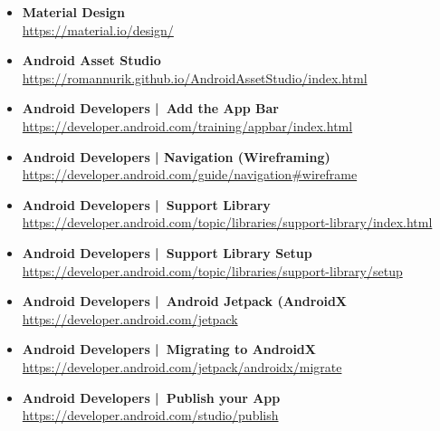 \documentclass[a4paper]{article}
\begin{document}
{\begin{itemize}
		\item \textbf{Material Design}\\
		\href{https://material.io/design/}
		{https://material.io/design/}
		
		\item \textbf{Android Asset Studio}\\
		\href{https://romannurik.github.io/AndroidAssetStudio/index.html}
		{https://romannurik.github.io/AndroidAssetStudio/index.html}
		
		\item \textbf{Android Developers | Add the App Bar}\\
		\href{https://developer.android.com/training/appbar/index.html}
		{https://developer.android.com/training/appbar/index.html}
		
		\item \textbf{Android Developers | Navigation (Wireframing)}\\
		\href{https://developer.android.com/guide/navigation#wireframe}
		{https://developer.android.com/guide/navigation\#wireframe}
		
		\item \textbf{Android Developers | Support Library}\\
		\href{https://developer.android.com/topic/libraries/support-library/index.html}
		{https://developer.android.com/topic/libraries/support-library/index.html}
		
		\item \textbf{Android Developers | Support Library Setup}\\
		\href{https://developer.android.com/topic/libraries/support-library/setup}
		{https://developer.android.com/topic/libraries/support-library/setup}
		
		\item \textbf{Android Developers | Android Jetpack (AndroidX}\\
		\href{https://developer.android.com/jetpack}
		{https://developer.android.com/jetpack}
		
		\item \textbf{Android Developers | Migrating to AndroidX}\\
		\href{https://developer.android.com/jetpack/androidx/migrate}
		{https://developer.android.com/jetpack/androidx/migrate}
		
		\item \textbf{Android Developers | Publish your App}\\
		\href{https://developer.android.com/studio/publish}
		{https://developer.android.com/studio/publish}
		

\end{itemize}}
\end{document}
